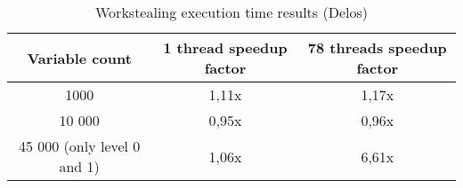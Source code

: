 \begin{table}[h!]
  \centering
  \begin{tabular}{||c | c | c||} 
   \hline
   Variable count & 1 thread speedup factor & 78 threads speedup factor \\ [0.5ex] 
   \hline\hline\hline
   1000 & 1,11x & 1,17x \\
   10 000 & 0,95x & 0,96x \\ 
   45 000 (only level 0 and 1) & 1,06x & 6,61x \\ [1ex] 
   \hline
  \end{tabular}
  \caption{Workstealing execution time results (Delos)}
  \label{table:workst_delos_scaling}
\end{table}